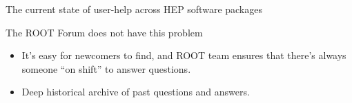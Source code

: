 \documentclass[aspectratio=169]{beamer}
\begin{document}
\begin{frame}{The current state of user-help across HEP software packages}
\vspace{0.25 cm}
\begin{center}
\end{center}
\end{frame}

\begin{frame}{The ROOT Forum does not have this problem}
\large
\vspace{0.25 cm}

\begin{center}
\end{center}

\begin{itemize}
\item<2-> It's easy for newcomers to find, and ROOT team ensures that there's always someone ``on shift'' to answer questions.
\item<3-> Deep historical archive of past questions and answers.
\end{itemize}
\end{frame}
\end{document}
